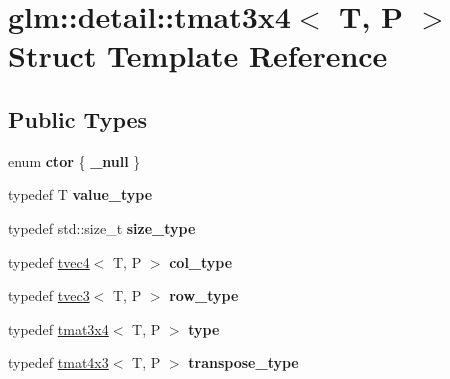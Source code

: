 \hypertarget{structglm_1_1detail_1_1tmat3x4}{\section{glm\-:\-:detail\-:\-:tmat3x4$<$ T, P $>$ Struct Template Reference}
\label{structglm_1_1detail_1_1tmat3x4}
}
\subsection*{Public Types}
\begin{DoxyCompactItemize}
\item 
enum {\bfseries ctor} \{ {\bfseries \-\_\-null}
 \}
\item 
\hypertarget{structglm_1_1detail_1_1tmat3x4_a541331f60862c273694a0b1f778fd571}{typedef T {\bfseries value\-\_\-type}}\label{structglm_1_1detail_1_1tmat3x4_a541331f60862c273694a0b1f778fd571}

\item 
\hypertarget{structglm_1_1detail_1_1tmat3x4_a6c23d9c4bf2cb48cfcdbec0b5d8451d2}{typedef std\-::size\-\_\-t {\bfseries size\-\_\-type}}\label{structglm_1_1detail_1_1tmat3x4_a6c23d9c4bf2cb48cfcdbec0b5d8451d2}

\item 
\hypertarget{structglm_1_1detail_1_1tmat3x4_aadea597c799e263c7580c0291753d0de}{typedef \hyperlink{structglm_1_1detail_1_1tvec4}{tvec4}$<$ T, P $>$ {\bfseries col\-\_\-type}}\label{structglm_1_1detail_1_1tmat3x4_aadea597c799e263c7580c0291753d0de}

\item 
\hypertarget{structglm_1_1detail_1_1tmat3x4_a4396c64d7fb3b10e98119bf1cac9ce9b}{typedef \hyperlink{structglm_1_1detail_1_1tvec3}{tvec3}$<$ T, P $>$ {\bfseries row\-\_\-type}}\label{structglm_1_1detail_1_1tmat3x4_a4396c64d7fb3b10e98119bf1cac9ce9b}

\item 
\hypertarget{structglm_1_1detail_1_1tmat3x4_ace1e67378a63acf5b64fd4d363647502}{typedef \hyperlink{structglm_1_1detail_1_1tmat3x4}{tmat3x4}$<$ T, P $>$ {\bfseries type}}\label{structglm_1_1detail_1_1tmat3x4_ace1e67378a63acf5b64fd4d363647502}

\item 
\hypertarget{structglm_1_1detail_1_1tmat3x4_a00d98ddf17fe798af973adf5a6916355}{typedef \hyperlink{structglm_1_1detail_1_1tmat4x3}{tmat4x3}$<$ T, P $>$ {\bfseries transpose\-\_\-type}}\label{structglm_1_1detail_1_1tmat3x4_a00d98ddf17fe798af973adf5a6916355}

\end{DoxyCompactItemize}
